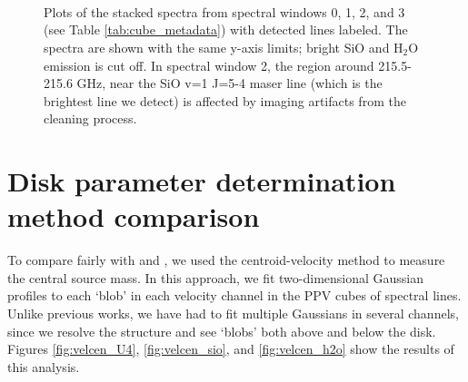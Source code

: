 \documentclass[twocolumn]{aastex61}
\newcommand{\water}{H$_{2}$O\xspace}		%
\begin{document}



\begin{figure}[!htp]
\vspace{0.001mm} \\
\vspace{0.001mm} \\
\vspace{0.001mm} \\
\vspace{0.001mm}
\caption{Plots of the stacked spectra from spectral windows 0, 1, 2, and 3 (see Table \ref{tab:cube_metadata})
with detected lines labeled.  The spectra are shown with the same y-axis limits; bright SiO and \water
emission is cut off.  In spectral window 2, the region around 215.5-215.6 GHz, near the SiO v=1 J=5-4
maser line (which is the brightest line we detect) is affected by imaging artifacts from the cleaning
process.}
\label{fig:stackplots_labeled}
\end{figure}





\section{Disk parameter determination method comparison}
\label{appendix:centroids}
To compare fairly with \citet{Hirota2014a} and \citet{Plambeck2016a}, we  used
the centroid-velocity method to measure the central source mass.  In this
approach, we fit two-dimensional Gaussian profiles to each `blob' in each
velocity channel in the PPV cubes of spectral lines.  Unlike previous works, we
have had to fit multiple Gaussians in several channels, since we resolve the
structure and see `blobs' both above and below the disk.  Figures
\ref{fig:velcen_U4}, \ref{fig:velcen_sio}, and \ref{fig:velcen_h2o} show the
results of this analysis.
\end{document}
